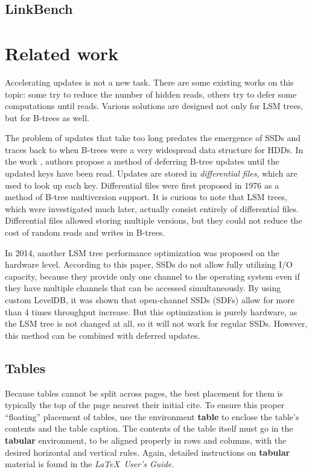 \documentclass{vldb}
\begin{document}
\subsection{LinkBench}

\section{Related work}
Accelerating updates is not a new task. There are some existing works
on this topic: some try to reduce the number of hidden reads, others try to
defer some computations until reads. Various solutions are designed not only for
LSM trees, but for B-trees as well.

The problem of updates that take too long predates the emergence of SSDs
and traces back to when B-trees were a very widespread data structure for
HDDs. In the work \cite{Edward:incremental_update}, authors propose a
method of deferring B-tree updates until the updated keys have been read.
Updates are stored in \textit{differential files}, which are used to look up
each key. Differential files were first proposed in 1976 \cite{Lohman:differential_files}
as a method of B-tree multiversion support. It is curious to note that LSM trees,
which were investigated much later, actually consist entirely of differential files.
Differential files allowed storing multiple versions, but they could not reduce
the cost of random reads and writes in B-trees.

In 2014, another LSM tree performance optimization was proposed
\cite{Wang:open_channel_ssd} on the hardware level. According to this paper, SSDs
do not allow fully utilizing I/O capacity, because they provide only one channel
to the operating system even if they have multiple channels that can be accessed
simultaneously. By using custom LevelDB, it was shown that open-channel SSDs
(SDFs) allow for more than 4 times throughput increase. But this optimization is
purely hardware, as the LSM tree is not changed at all, so it will not work for
regular SSDs. However, this method can be combined with deferred updates.

\subsection{Tables}
Because tables cannot be split across pages, the best
placement for them is typically the top of the page
nearest their initial cite.  To
ensure this proper ``floating'' placement of tables, use the
environment \textbf{table} to enclose the table's contents and
the table caption.  The contents of the table itself must go
in the \textbf{tabular} environment, to
be aligned properly in rows and columns, with the desired
horizontal and vertical rules.  Again, detailed instructions
on \textbf{tabular} material
is found in the \textit{\LaTeX\ User's Guide}.
\end{document}
